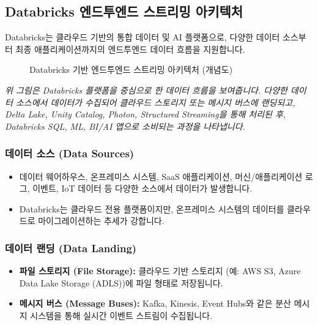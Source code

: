 \documentclass[11pt,a4paper]{article}
\theoremstyle{definition}
\begin{document}
\subsection{Databricks 엔드투엔드 스트리밍 아키텍처}

Databricks는 클라우드 기반의 통합 데이터 및 AI 플랫폼으로, 다양한 데이터 소스부터 최종 애플리케이션까지의 엔드투엔드 데이터 흐름을 지원합니다.

\begin{figure}[htbp]
\centering
\caption{Databricks 기반 엔드투엔드 스트리밍 아키텍처 (개념도)}
\label{fig:databricks_architecture}
\end{figure}
\textit{위 그림은 Databricks 플랫폼을 중심으로 한 데이터 흐름을 보여줍니다. 다양한 데이터 소스에서 데이터가 수집되어 클라우드 스토리지 또는 메시지 버스에 랜딩되고, Delta Lake, Unity Catalog, Photon, Structured Streaming을 통해 처리된 후, Databricks SQL, ML, BI/AI 앱으로 소비되는 과정을 나타냅니다.}

\subsubsection{데이터 소스 (Data Sources)}
\begin{itemize}
    \item 데이터 웨어하우스, 온프레미스 시스템, SaaS 애플리케이션, 머신/애플리케이션 로그, 이벤트, IoT 데이터 등 다양한 소스에서 데이터가 발생합니다.
    \item Databricks는 클라우드 전용 플랫폼이지만, 온프레미스 시스템의 데이터를 클라우드로 마이그레이션하는 추세가 강합니다.
\end{itemize}

\subsubsection{데이터 랜딩 (Data Landing)}
\begin{itemize}
    \item \textbf{파일 스토리지 (File Storage):} 클라우드 기반 스토리지 (예: AWS S3, Azure Data Lake Storage (ADLS))에 파일 형태로 저장됩니다.
    \item \textbf{메시지 버스 (Message Buses):} Kafka, Kinesis, Event Hubs와 같은 분산 메시지 시스템을 통해 실시간 이벤트 스트림이 수집됩니다.
\end{itemize}
\end{document}
